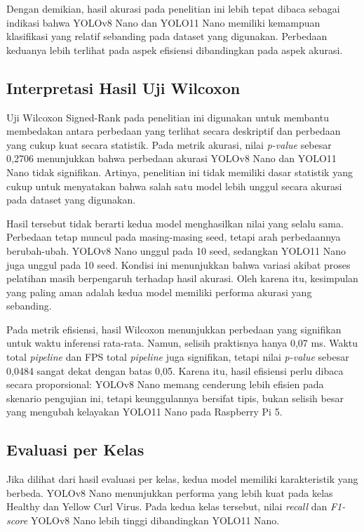\begin{sectioncontent}
\begin{subsectioncontent}
        Dengan demikian, hasil akurasi pada penelitian ini lebih tepat dibaca sebagai indikasi bahwa YOLOv8 Nano dan YOLO11 Nano memiliki kemampuan klasifikasi yang relatif sebanding pada dataset yang digunakan. Perbedaan keduanya lebih terlihat pada aspek efisiensi dibandingkan pada aspek akurasi.
    \end{subsectioncontent}

    \subsection{Interpretasi Hasil Uji Wilcoxon}
    \begin{subsectioncontent}
        \hspace{\parindent}Uji Wilcoxon Signed-Rank pada penelitian ini digunakan untuk membantu membedakan antara perbedaan yang terlihat secara deskriptif dan perbedaan yang cukup kuat secara statistik. Pada metrik akurasi, nilai \textit{p-value} sebesar 0,2706 menunjukkan bahwa perbedaan akurasi YOLOv8 Nano dan YOLO11 Nano tidak signifikan. Artinya, penelitian ini tidak memiliki dasar statistik yang cukup untuk menyatakan bahwa salah satu model lebih unggul secara akurasi pada dataset yang digunakan.

        Hasil tersebut tidak berarti kedua model menghasilkan nilai yang selalu sama. Perbedaan tetap muncul pada masing-masing seed, tetapi arah perbedaannya berubah-ubah. YOLOv8 Nano unggul pada 10 seed, sedangkan YOLO11 Nano juga unggul pada 10 seed. Kondisi ini menunjukkan bahwa variasi akibat proses pelatihan masih berpengaruh terhadap hasil akurasi. Oleh karena itu, kesimpulan yang paling aman adalah kedua model memiliki performa akurasi yang sebanding.

        Pada metrik efisiensi, hasil Wilcoxon menunjukkan perbedaan yang signifikan untuk waktu inferensi rata-rata. Namun, selisih praktisnya hanya 0,07 ms. Waktu total \textit{pipeline} dan FPS total \textit{pipeline} juga signifikan, tetapi nilai \textit{p-value} sebesar 0,0484 sangat dekat dengan batas 0,05. Karena itu, hasil efisiensi perlu dibaca secara proporsional: YOLOv8 Nano memang cenderung lebih efisien pada skenario pengujian ini, tetapi keunggulannya bersifat tipis, bukan selisih besar yang mengubah kelayakan YOLO11 Nano pada Raspberry Pi 5.
    \end{subsectioncontent}

    \subsection{Evaluasi per Kelas}
    \begin{subsectioncontent}
        \hspace{\parindent}Jika dilihat dari hasil evaluasi per kelas, kedua model memiliki karakteristik yang berbeda. YOLOv8 Nano menunjukkan performa yang lebih kuat pada kelas Healthy dan Yellow Curl Virus. Pada kedua kelas tersebut, nilai \textit{recall} dan \textit{F1-score} YOLOv8 Nano lebih tinggi dibandingkan YOLO11 Nano.


\end{subsectioncontent}
\end{sectioncontent}
